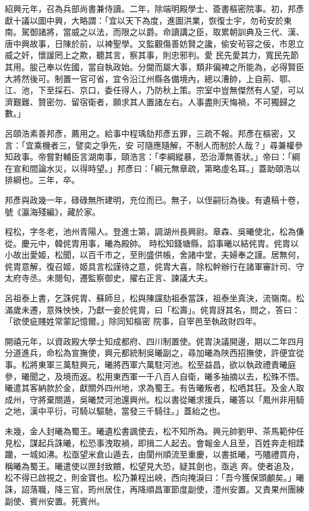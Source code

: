 \begin{pinyinscope}
 紹興元年，召為兵部尚書兼侍讀。二年，除端明殿學士、簽書樞密院事。初，邦彥獻十議以圖中興，大略謂：「宜以天下為度，進圖洪業，恢復士宇，勿茍安於東南。駕御諸將，當威之以法，而限之以爵。命讀講之臣，取累朝訓典及三代、漢、唐中興故事，日陳於前，以裨聖學。又監觀傷善妨賢之讒，偷安茍容之佞，市恩立威之奸，懷諼罔上之欺，聽其言，察其事，則忠邪判。愛
 民先愛其力，寬民先節其用。朘己奉以佐國，當自執政始。分閫而屬大事，類非偏裨之所能為，必得賢臣大將然後可。制置一官可省，宜令沿江州縣各備境內，總以漕帥，上自荊、鄂、江、池，下至採石、京口，委任得人，乃防秋上策。宗室中豈無傑然有人望，可以濟艱難、贊密勿、留宿衛者，願求其人置諸左右。人事盡則天悔禍，不可獨歸之數。」



 呂頤浩素善邦彥，薦用之。給事中程瑀劾邦彥五罪，三疏不報。邦彥在樞密，又言：「宜乘機者三，譬奕之爭先，安
 可隨應隨解，不制人而制於人哉？」尋兼權參知政事。帝嘗對輔臣言湖南事，頤浩言：「李綱縱暴，恐治潭無善狀。」帝曰：「綱在宣和間論水災，以得時望。」邦彥曰：「綱元無章疏，第略虛名耳。」蓋助頤浩以排綱也。三年，卒。



 邦彥與政幾一年，碌碌無所建明，充位而已。無子，以侄嗣衍為後。有遺稿十卷，號《瀛海殘編》，藏於家。



 程松，字冬老，池州青陽人。登進士第，調湖州長興尉。章森、吳曦使北，松為傔從。慶元中，韓侂胄用事，曦為殿帥。
 時松知錢塘縣，諂事曦以結侂胄。侂胄以小故出愛姬，松聞，以百千市之，至則盛供帳，舍諸中堂，夫婦奉之謹。居無何，侂胄意解，復召姬，姬具言松謹待之意，侂胄大喜，除松幹辦行在諸軍審計司、守太府寺丞。未閱旬，遷監察御史，擢右正言、諫議大夫。



 呂祖泰上書，乞誅侂胄、蘇師旦，松與陳讜劾祖泰當誅，祖泰坐真決，流嶺南。松滿歲未遷，意殊怏怏，乃獻一妾於侂胄，曰「松壽」。侂胄訝其名，問之，答曰：「欲使疵賤姓常蒙記憶爾。」除同知樞密
 院事，自宰邑至執政財四年。



 開禧元年，以資政殿大學士知成都府、四川制置使。侂胄決議開邊，期以二年四月分道進兵，命松為宣撫使，興元都統制吳曦副之，尋加曦為陜西招撫使，許便宜從事。松將東軍三萬駐興元，曦將西軍六萬駐河池。松至益昌，欲以執政禮責曦庭參，曦聞之，及境而返。松用東西軍一千八百人自衛，曦多抽摘以去，松殊不悟。曦遣其客納款於金，獻關外四州地，求為蜀王。有告曦叛者，松哂其狂。及金人取
 成州，守將棄關遁，吳曦焚河池還興州。松以書從曦求援兵，曦答以「鳳州非用騎之地，漢中平衍，可騎以驅馳，當發三千騎往。」蓋紿之也。



 未幾，金人封曦為蜀王。曦遺松書諷使去，松不知所為。興元帥劉甲、茶馬範仲任見松，謀起兵誅曦，松恐事洩取禍，即揖二人起去。會報金人且至，百姓奔走相蹂躪，一城如沸。松亟望米倉山遁去，由閬州順流至重慶，以書抵曦，丐贐禮買舟，稱曦為蜀王。曦遣使以匣封致饋，松望見大恐，疑其劍也，亟逃
 奔。使者追及，松不得已啟視之，則金寶也。松乃兼程出峽，西向掩淚曰：「吾今獲保頭顱矣。」曦誅，詔落職，降三官，筠州居住，再降順昌軍節度副使，澧州安置。又責果州團練副使、賓州安置。死賓州。




\end{pinyinscope}
